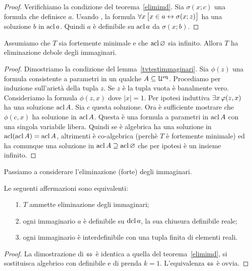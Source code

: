 \begin{proof}
Verifichiamo la condizione  del teorema~\ref{elimimd}. Sia $\sigma(x;c)$ una formula che definisce $a$. Usando , la formula $\forall x\,\big[ x\in a\leftrightarrow\sigma(x;z)\big]$ ha una soluzione $b$ in $\mathop{\rm acl} a$. Quindi $a$ \`e definibile su $\mathop{\rm acl} a$ da $\sigma(x;b)$.
\end{proof}

\begin{theorem}\label{elimimsm} 
Assumiamo che $T$ sia fortemente minimale e che $\mathop{\rm acl}\varnothing$ sia infinito. Allora $T$ ha eliminazione debole degli immaginari.
\end{theorem}

\begin{proof}
Dimostriamo la condizione  del lemma~\ref{tvtestimmaginari}. Sia $\phi(z)$ una formula consistente a parametri in un qualche $A\subseteq\EuScript U^{\rm eq}$. Procediamo per induzione sull'ariet\`a della tupla $z$. Se $z$ \`e la tupla vuota \`e banalmente vero. Consideriamo la formula $\phi(z,x)$ dove $|x|=1$. Per ipotesi induttiva $\exists x\,\varphi(z,x)$ ha una soluzione $\mathop{\rm acl} A$. Sia $c$ questa soluzione. Ora \`e sufficiente mostrare che $\phi(c,x)$ ha soluzione in $\mathop{\rm acl} A$. Questa \`e una formula a parametri in $\mathop{\rm acl} A$ con una singola variabile libera. Quindi se \`e algebrica ha una soluzione in $\mathop{\rm acl}(\mathop{\rm acl} A)=\mathop{\rm acl} A$, altrimenti \`e co-algebrica (perch\`e $T$ \`e fortemente minimale) ed ha comunque una soluzione in $\mathop{\rm acl} A\supseteq\mathop{\rm acl}\varnothing$ che per ipotesi \`e un insieme infinito.
\end{proof}

Passiamo a considerare l'eliminazione (forte) degli immaginari.

\begin{theorem}\label{elimimf} 
Le seguenti affermazioni sono equivalenti:
\begin{itemize}
\item[1.] $T$ ammette eliminazione degli immaginari;
\item[2.] ogni immaginario $a$ \`e definibile su $\mathop{\rm dcl} a$, la sua chiusura definibile reale;
\item[3.] ogni immaginario \`e interdefinibile con una tupla finita di elementi reali.
\end{itemize}
\end{theorem}

\begin{proof}
La dimostrazione di $\Leftrightarrow$ \`e identica a quella del teorema~\ref{elimimd}, si sostituisca algebrico con definibile e di prenda $k=1$. L'equivalenza $\Leftrightarrow$ \`e ovvia.\end{proof}


